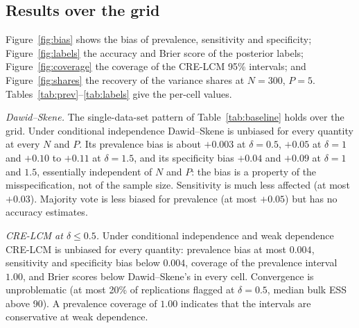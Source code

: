 \subsection{Results over the grid}\label{sec:sim_results}

Figure~\ref{fig:bias} shows the bias of prevalence, sensitivity and specificity;
Figure~\ref{fig:labels} the accuracy and Brier score of the posterior labels;
Figure~\ref{fig:coverage} the coverage of the CRE-LCM 95\% intervals; and
Figure~\ref{fig:shares} the recovery of the variance shares at $N = 300$, $P = 5$.
Tables~\ref{tab:prev}--\ref{tab:labels} give the per-cell values.

\emph{Dawid--Skene.} The single-data-set pattern of Table~\ref{tab:baseline} holds over
the grid. Under conditional independence Dawid--Skene is unbiased for every quantity at
every $N$ and $P$. Its prevalence bias is about $+0.003$ at $\delta = 0.5$, $+0.05$ at
$\delta = 1$ and $+0.10$ to $+0.11$ at $\delta = 1.5$, and its specificity bias
$+0.04$ and $+0.09$ at $\delta = 1$ and $1.5$, essentially independent of $N$ and $P$:
the bias is a property of the misspecification, not of the sample size. Sensitivity is
much less affected (at most $+0.03$). Majority vote is less biased for prevalence
(at most $+0.05$) but has no accuracy estimates.

\emph{CRE-LCM at $\delta \le 0.5$.} Under conditional independence and weak dependence
CRE-LCM is unbiased for every quantity: prevalence bias at most $0.004$, sensitivity and
specificity bias below $0.004$, coverage of the prevalence interval $1.00$, and Brier
scores below Dawid--Skene's in every cell. Convergence is unproblematic (at most 20\% of
replications flagged at $\delta = 0.5$, median bulk ESS above 90). A prevalence coverage of $1.00$ indicates that the intervals are conservative at weak dependence.

